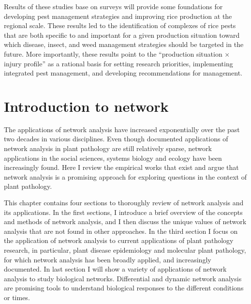  Results of these studies base on surveys will provide some foundations for developing pest management strategies and improving rice production at the regional scale. These results led to the identification of complexes of rice pests that are both specific to and important for a given production situation toward which disease, insect, and weed management strategies should be targeted in the future. More importantly, these results point to the “production situation × injury profile” as a rational basis for setting research priorities, implementing integrated pest management, and developing recommendations for management.

\section*{Introduction to network}
The applications of network analysis have increased exponentially over the past two decades in various disciplines. Even though documented applications of network analysis in plant pathology are still relatively sparse, network applications in the social sciences, systems biology and ecology have been increasingly found. Here I review the empirical works that exist and argue that network analysis is a promising approach for exploring questions in the context of plant pathology.


This chapter contains four sections to thoroughly review of network analysis and its applications. In the first sections, I introduce a brief overview of the concepts and methods of network analysis, and I then discuss the unique values of network analysis that are not found in other approaches. In the third section I focus on the application of network analysis to current applications of plant pathology research, in particular, plant disease epidemiology and molecular plant pathology, for which network analysis has been broadly applied, and increasingly documented. In last section I will show a variety of applications of network analysis to study biological networks. Differential and dynamic network analysis are promising tools to understand biological responses to the different conditions or times.



